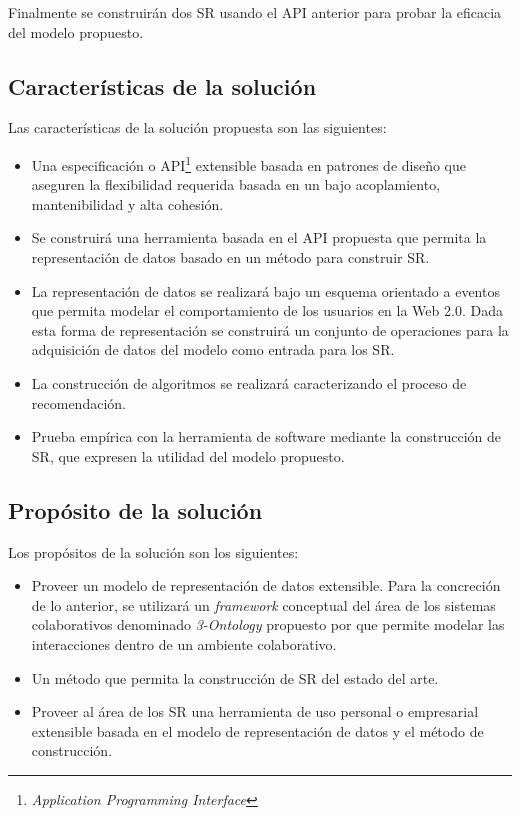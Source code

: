 Finalmente se construirán dos SR usando el API anterior para probar la eficacia del modelo propuesto.

\subsection{Caracter\'isticas de la solución}
\label{intro:caracteristicassolucion}

Las características de la solución propuesta son las siguientes:

\begin{itemize}
	\item Una especificación o API\footnote{\textit{Application Programming Interface}} extensible basada en patrones de diseño que aseguren la flexibilidad requerida basada en un bajo acoplamiento, mantenibilidad y alta cohesión.
	\item Se construirá una herramienta basada en el API propuesta que permita la representación de datos basado en un método para construir SR. 
	\item La representación de datos se realizará bajo un esquema orientado a eventos que permita	 modelar el comportamiento de los usuarios en la Web 2.0. Dada esta forma de representación se construirá un conjunto de operaciones para la adquisición de datos del modelo como entrada para los SR.
	\item La construcción de algoritmos se realizará caracterizando el proceso de recomendación.
	\item Prueba empírica con la herramienta de software mediante la construcción de SR, que expresen la utilidad del modelo propuesto.
\end{itemize}

\subsection{Prop\'osito de la solución}
\label{intro:propositosolucion}
Los propósitos de la solución son los siguientes:

\begin{itemize}
\item Proveer un modelo de representación de datos extensible. Para la concreción de lo anterior, se utilizará un \textit{framework} conceptual del área de los sistemas colaborativos denominado \textit{3-Ontology} propuesto por \citep{Leiva:2002} que permite modelar las interacciones dentro de un ambiente colaborativo.
\item Un método que permita la construcción de SR del estado del arte.
\item Proveer al área de los SR una herramienta de uso personal o empresarial extensible basada en el modelo de representación de datos y el método de construcción.
\end{itemize}


